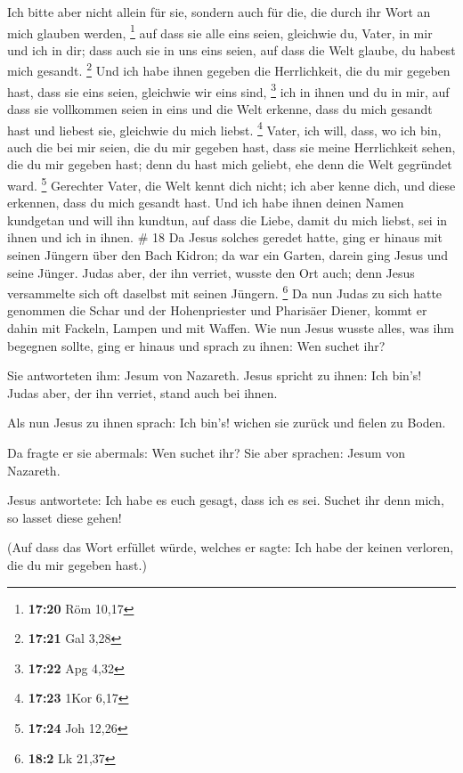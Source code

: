  Ich bitte aber nicht allein für sie, sondern auch für die,
die durch ihr Wort an mich glauben werden, \footnote{\textbf{17:20} Röm
  10,17}  auf dass sie alle eins seien, gleichwie du,
Vater, in mir und ich in dir; dass auch sie in uns eins seien, auf dass
die Welt glaube, du habest mich gesandt. \footnote{\textbf{17:21} Gal
  3,28}  Und ich habe ihnen gegeben die Herrlichkeit, die
du mir gegeben hast, dass sie eins seien, gleichwie wir eins sind,
\footnote{\textbf{17:22} Apg 4,32}  ich in ihnen und du in
mir, auf dass sie vollkommen seien in eins und die Welt erkenne, dass du
mich gesandt hast und liebest sie, gleichwie du mich liebst. \footnote{\textbf{17:23}
  1Kor 6,17}  Vater, ich will, dass, wo ich bin, auch die
bei mir seien, die du mir gegeben hast, dass sie meine Herrlichkeit
sehen, die du mir gegeben hast; denn du hast mich geliebt, ehe denn die
Welt gegründet ward. \footnote{\textbf{17:24} Joh 12,26} 
Gerechter Vater, die Welt kennt dich nicht; ich aber kenne dich, und
diese erkennen, dass du mich gesandt hast.  Und ich habe
ihnen deinen Namen kundgetan und will ihn kundtun, auf dass die Liebe,
damit du mich liebst, sei in ihnen und ich in ihnen. \# 18 
Da Jesus solches geredet hatte, ging er hinaus mit seinen Jüngern über
den Bach Kidron; da war ein Garten, darein ging Jesus und seine Jünger.
 Judas aber, der ihn verriet, wusste den Ort auch; denn
Jesus versammelte sich oft daselbst mit seinen Jüngern. \footnote{\textbf{18:2}
  Lk 21,37}  Da nun Judas zu sich hatte genommen die Schar
und der Hohenpriester und Pharisäer Diener, kommt er dahin mit Fackeln,
Lampen und mit Waffen.  Wie nun Jesus wusste alles, was ihm
begegnen sollte, ging er hinaus und sprach zu ihnen: Wen suchet ihr?

 Sie antworteten ihm: Jesum von Nazareth. Jesus spricht zu
ihnen: Ich bin's! Judas aber, der ihn verriet, stand auch bei ihnen.

 Als nun Jesus zu ihnen sprach: Ich bin's! wichen sie zurück
und fielen zu Boden.

 Da fragte er sie abermals: Wen suchet ihr? Sie aber
sprachen: Jesum von Nazareth.

 Jesus antwortete: Ich habe es euch gesagt, dass ich es sei.
Suchet ihr denn mich, so lasset diese gehen!

 (Auf dass das Wort erfüllet würde, welches er sagte: Ich
habe der keinen verloren, die du mir gegeben hast.)

